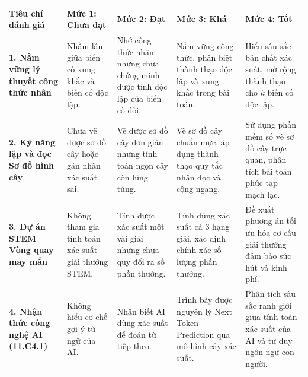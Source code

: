 \documentclass[12pt, a4paper]{article}
\begin{document}
\begin{center}
\small
\begin{tabularx}{\linewidth}{|p{3cm}|X|X|X|X|}
\hline
\textbf{Tiêu chí đánh giá} & \textbf{Mức 1: Chưa đạt} & \textbf{Mức 2: Đạt} & \textbf{Mức 3: Khá} & \textbf{Mức 4: Tốt} \\ \hline
\textbf{1. Nắm vững lý thuyết công thức nhân} & Nhầm lẫn giữa biến cố xung khắc và biến cố độc lập. & Nhớ công thức nhân nhưng chưa chứng minh được tính độc lập của biến cố đối. & Nắm vững công thức, phân biệt thành thạo độc lập và xung khắc trong bài toán. & Hiểu sâu sắc bản chất xác suất, mở rộng thành thạo cho $k$ biến cố độc lập. \\ \hline
\textbf{2. Kỹ năng lập và đọc Sơ đồ hình cây} & Chưa vẽ được sơ đồ cây hoặc gán nhãn xác suất sai. & Vẽ được sơ đồ cây đơn giản nhưng tính toán ngọn cây còn lúng túng. & Vẽ sơ đồ cây chuẩn mực, áp dụng thành thạo quy tắc nhân dọc và cộng ngang. & Sử dụng phần mềm số vẽ sơ đồ cây trực quan, phân tích bài toán phức tạp mạch lạc. \\ \hline
\textbf{3. Dự án STEM Vòng quay may mắn} & Không tham gia tính toán xác suất giải thưởng STEM. & Tính được xác suất một vài giải nhưng chưa quy đổi ra số phần thưởng. & Tính đúng xác suất cả 3 hạng giải, xác định chính xác số lượng phần thưởng. & Đề xuất phương án tối ưu hóa cơ cấu giải thưởng đảm bảo sức hút và kinh phí. \\ \hline
\textbf{4. Nhận thức công nghệ AI (11.C4.1)} & Không hiểu cơ chế gợi ý từ ngữ của AI. & Nhận biết AI dùng xác suất để đoán từ tiếp theo. & Trình bày được nguyên lý Next Token Prediction qua mô hình cây xác suất. & Phân tích sâu sắc ranh giới giữa tính toán xác suất của AI và tư duy ngôn ngữ con người. \\ \hline
\end{tabularx}
\end{center}
\end{document}
